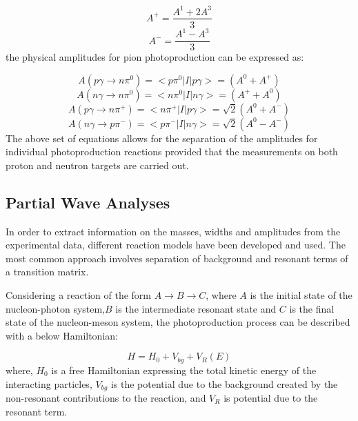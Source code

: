 \begin{equation}
A^{+}=\frac{A^{1}+2A^{3}}{3}
\end{equation}
\begin{equation}
A^{-}=\frac{A^{1}-A^{3}}{3}
\end{equation}
the physical amplitudes for pion photoproduction can be expressed as:

\begin{equation}
A(p\gamma \rightarrow n\pi^{0})=<p\pi^{0}|I|p\gamma>=(A^{0}+A^{+})
\end{equation}
\begin{equation}
A(n\gamma \rightarrow n\pi^{0})=<n\pi^{0}|I|n\gamma>=(A^{+}+A^{0})
\end{equation}
\begin{equation}
A(p\gamma \rightarrow n\pi^{+})=<n\pi^{+}|I|p\gamma>=\sqrt{2}(A^{0}+A^{-})
\end{equation}
\begin{equation}
A(n\gamma \rightarrow p\pi^{-})=<p\pi^{-}|I|n\gamma>=\sqrt{2}(A^{0}-A^{-})
\end{equation}
The above set of equations allows for the separation of the amplitudes for individual photoproduction reactions provided that the measurements on both proton and neutron targets are carried out.

\subsection{Partial Wave Analyses}

\indent In order to extract information on the masses, widths and amplitudes from the experimental data, different reaction models have been developed and used. The most common approach involves separation of background and resonant terms of a transition matrix.

\indent Considering a reaction of the form $A\rightarrow B\rightarrow C$, where $A$ is the initial state of the nucleon-photon system,$B$ is the intermediate resonant state and $C$ is the final state of the nucleon-meson system, the photoproduction process can be described with a below Hamiltonian:

\begin{equation}
H=H_{0}+V_{bg}+V_{R}(E)
\end{equation}
where, $H_{0}$ is a free Hamiltonian expressing the total kinetic energy of the interacting particles, $V_{bg}$ is the potential due to the background created by the non-resonant contributions to the reaction, and $V_{R}$ is potential due to the resonant term.

